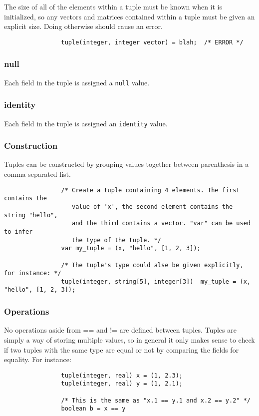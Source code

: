 \documentclass[../../gazprea.tex]{subfiles}
\begin{document}
			The size of all of the elements within a tuple must be known when it is initialized, so any vectors and
			matrices contained within a tuple must be given an explicit size. Doing otherwise should cause an error.

			\begin{lstlisting}
				tuple(integer, integer vector) = blah;  /* ERROR */
			\end{lstlisting}

		\subsubsection{null}

			Each field in the tuple is assigned a \texttt{null} value.

		\subsubsection{identity}

			Each field in the tuple is assigned an \texttt{identity} value.

		\subsubsection{Construction}

			Tuples can be constructed by grouping values together between parenthesis in a comma separated list.
			\begin{lstlisting}
				/* Create a tuple containing 4 elements. The first contains the
				   value of 'x', the second element contains the string "hello",
				   and the third contains a vector. "var" can be used to infer
				   the type of the tuple. */
				var my_tuple = (x, "hello", [1, 2, 3]);

				/* The tuple's type could alse be given explicitly, for instance: */
				tuple(integer, string[5], integer[3])  my_tuple = (x, "hello", [1, 2, 3]);
			\end{lstlisting}

		\subsubsection{Operations}

			No operations aside from == and != are defined between tuples. Tuples are simply a way of storing multiple
			values, so in general it only makes sense to check if two tuples with the same type are equal or not by
			comparing the fields for equality. For instance:

			\begin{lstlisting}
				tuple(integer, real) x = (1, 2.3);
				tuple(integer, real) y = (1, 2.1);

				/* This is the same as "x.1 == y.1 and x.2 == y.2" */
				boolean b = x == y
			\end{lstlisting}
\end{document}
